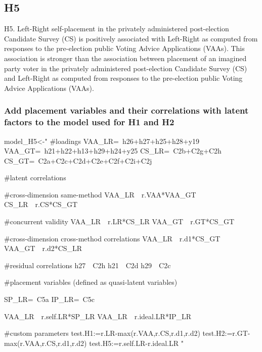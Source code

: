 \documentclass[
]{article}
\newenvironment{Shaded}{\begin{snugshade}}{\end{snugshade}}
\newcommand{\NormalTok}[1]{#1}
\newcommand{\StringTok}[1]{\textcolor[rgb]{0.31,0.60,0.02}{#1}}
\begin{document}
\newpage

\hypertarget{h5}{%
\subsection{H5}\label{h5}}

H5. Left-Right self-placement in the privately administered
post-election Candidate Survey (CS) is positively associated with
Left-Right as computed from responses to the pre-election public Voting
Advice Applications (VAAs). This association is stronger than the
association between placement of an imagined party voter in the
privately administered post-election Candidate Survey (CS) and
Left-Right as computed from responses to the pre-election public Voting
Advice Applications (VAAs).

\hypertarget{add-placement-variables-and-their-correlations-with-latent-factors-to-the-model-used-for-h1-and-h2}{%
\subsubsection{Add placement variables and their correlations with
latent factors to the model used for H1 and
H2}\label{add-placement-variables-and-their-correlations-with-latent-factors-to-the-model-used-for-h1-and-h2}}

\begin{Shaded}
\begin{Highlighting}[]
\NormalTok{model_H5<-}\StringTok{"}
\StringTok{#loadings}
\StringTok{VAA_LR=~h26+h27+h25+h28+y19}
\StringTok{VAA_GT=~h21+h22+h13+h29+h24+y25}
\StringTok{CS_LR=~C2b+C2g+C2h}
\StringTok{CS_GT=~C2a+C2c+C2d+C2e+C2f+C2i+C2j}

\StringTok{#latent correlations}

\StringTok{#cross-dimension same-method}
\StringTok{VAA_LR~~r.VAA*VAA_GT}
\StringTok{CS_LR~~r.CS*CS_GT}

\StringTok{#concurrent validity}
\StringTok{VAA_LR~~r.LR*CS_LR}
\StringTok{VAA_GT~~r.GT*CS_GT}

\StringTok{#cross-dimension cross-method correlations}
\StringTok{VAA_LR~~r.d1*CS_GT}
\StringTok{VAA_GT~~r.d2*CS_LR}

\StringTok{#residual correlations}
\StringTok{h27~~C2h}
\StringTok{h21~~C2d}
\StringTok{h29~~C2c}

\StringTok{#placement variables (defined as quasi-latent variables)}

\StringTok{SP_LR=~C5a}
\StringTok{IP_LR=~C5c}

\StringTok{VAA_LR~~r.self.LR*SP_LR}
\StringTok{VAA_LR~~r.ideal.LR*IP_LR}

\StringTok{#custom parameters}
\StringTok{test.H1:=r.LR-max(r.VAA,r.CS,r.d1,r.d2)}
\StringTok{test.H2:=r.GT-max(r.VAA,r.CS,r.d1,r.d2)}
\StringTok{test.H5:=r.self.LR-r.ideal.LR}
\StringTok{"}
\end{Highlighting}
\end{Shaded}
\end{document}
